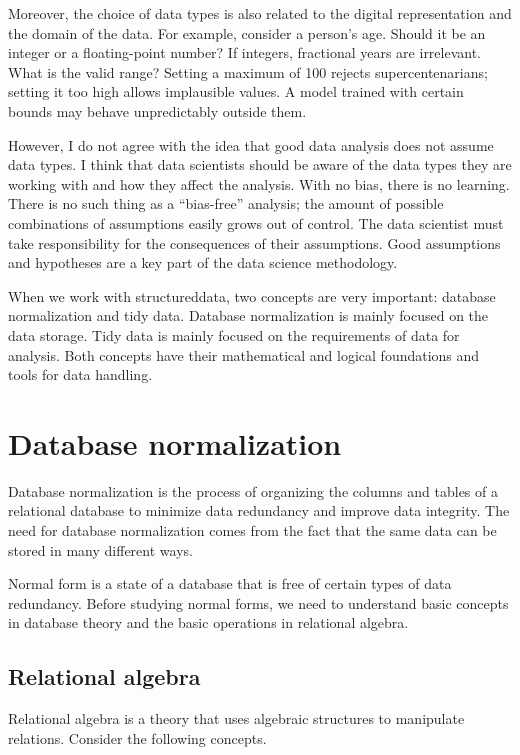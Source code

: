 Moreover, the choice of data types is also related to the digital representation and the
domain of the data.  For example, consider a person's age.  Should it be an integer or a
floating-point number?  If integers, fractional years are irrelevant.  What is the valid
range?  Setting a maximum of 100 rejects supercentenarians; setting it too high allows
implausible values.  A model trained with certain bounds may behave unpredictably outside
them.

However, I do not agree with the idea that good data analysis does not assume data types.
I think that data scientists should be aware of the data types they are working with and
how they affect the analysis.  With no bias, there is no learning.  There is no such
thing as a ``bias-free'' analysis; the amount of possible combinations of assumptions
easily grows out of control.  The data scientist must take responsibility for the
consequences of their assumptions.  Good assumptions and hypotheses are a key part of the
data science methodology.

When we work with \gls{structureddata}, two concepts are very important: database normalization
and tidy data.  Database normalization is mainly focused on the data storage.  Tidy data is
mainly focused on the requirements of data for analysis.  Both concepts have their
mathematical and logical foundations and tools for data handling.

\section{Database normalization}
\label{sec:normalization}

Database normalization is the process of organizing the columns and tables of a relational
database to minimize data redundancy and improve data integrity.  The need for database
normalization comes from the fact that the same data can be stored in many different ways.

Normal form is a state of a database that is free of certain types of data redundancy.
Before studying normal forms, we need to understand basic concepts in database theory
and the basic operations in relational algebra.

\subsection{Relational algebra}

Relational algebra is a theory that uses algebraic structures to manipulate relations.
Consider the following concepts.

